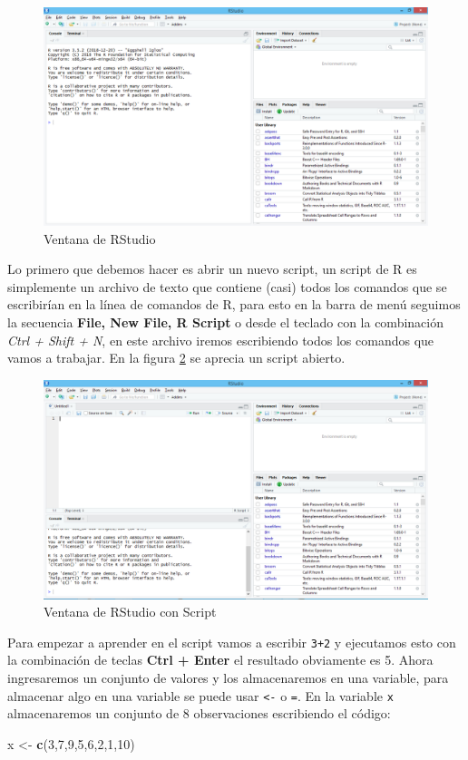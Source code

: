 \documentclass[]{book}
\newenvironment{Shaded}{\begin{snugshade}}{\end{snugshade}}
\newcommand{\KeywordTok}[1]{\textcolor[rgb]{0.13,0.29,0.53}{\textbf{#1}}}
\newcommand{\DecValTok}[1]{\textcolor[rgb]{0.00,0.00,0.81}{#1}}
\newcommand{\StringTok}[1]{\textcolor[rgb]{0.31,0.60,0.02}{#1}}
\newcommand{\NormalTok}[1]{#1}
\begin{document}
\begin{figure}[h]

{\centering \includegraphics[width=0.5\linewidth]{rstudio1} 

}

\caption{Ventana de RStudio}\label{fig:rstudio1}
\end{figure}

Lo primero que debemos hacer es abrir un nuevo script, un script de R es
simplemente un archivo de texto que contiene (casi) todos los comandos
que se escribirían en la línea de comandos de R, para esto en la barra
de menú seguimos la secuencia \textbf{File, New File, R Script} o desde
el teclado con la combinación \emph{Ctrl + Shift + N}, en este archivo
iremos escribiendo todos los comandos que vamos a trabajar. En la figura
\ref{fig:rstudio2} se aprecia un script abierto.

\begin{figure}[h]

{\centering \includegraphics[width=0.5\linewidth]{rstudio2} 

}

\caption{Ventana de RStudio con Script}\label{fig:rstudio2}
\end{figure}

Para empezar a aprender en el script vamos a escribir \texttt{3+2} y
ejecutamos esto con la combinación de teclas \textbf{Ctrl + Enter} el
resultado obviamente es 5. Ahora ingresaremos un conjunto de valores y
los almacenaremos en una variable, para almacenar algo en una variable
se puede usar \texttt{\textless{}-} o \texttt{=}. En la variable
\texttt{x} almacenaremos un conjunto de 8 observaciones escribiendo el
código:

\begin{Shaded}
\begin{Highlighting}[]
\NormalTok{x <-}\StringTok{ }\KeywordTok{c}\NormalTok{(}\DecValTok{3}\NormalTok{,}\DecValTok{7}\NormalTok{,}\DecValTok{9}\NormalTok{,}\DecValTok{5}\NormalTok{,}\DecValTok{6}\NormalTok{,}\DecValTok{2}\NormalTok{,}\DecValTok{1}\NormalTok{,}\DecValTok{10}\NormalTok{) }
\end{Highlighting}
\end{Shaded}
\end{document}
